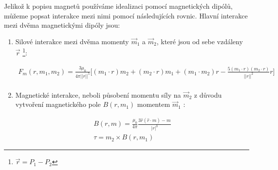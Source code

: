 Jelikož k popisu magnetů používáme idealizaci pomocí magnetických dipólů, můžeme popsat interakce mezi nimi pomocí následujících rovnic.
Hlavní interakce mezi dvěma magnetickými dipóly jsou:
\begin{enumerate}[topsep=0pt, partopsep=0pt]
    \setlength{\itemsep}{0pt}%
    \setlength{\parskip}{0pt}%

    \item Silové interakce \cite{magnetic_force} mezi dvěma momenty $\vec{m}_1$ a $\vec{m}_2$, které jsou od sebe vzdáleny $\vec{r}$ \footnote{$\vec{r} = P_1 - P_2$}:

          \begin{equation}
              \label{eq:F_m}
              \begin{split}
                  F_m (r,m_1,m_2) = \frac{3\mu_0}{4\pi ||r||^5}
                  \bigg[
                      (m_1\cdot r) m_2 +
                      (m_2\cdot r) m_1 +
                      (m_1\cdot m_2) r -
                      \frac{5(m_1\cdot r)(m_2\cdot r)}{||r||^2} r
                  \bigg] \\
              \end{split}
          \end{equation}

    \item Magnetické interakce, neboli působení momentu síly \cite{magnetic_torque} na $\vec{m}_2$ z důvodu vytvoření magnetického pole $B(r, m_1)$ momentem $\vec{m}_1$ \cite{magnetic_force}:

          \begin{equation}
              \label{eq:B}
              \begin{split}
                  B (r, m) = \frac{\mu_0}{4\pi}\frac{3 \hat{r}(\hat{r}\cdot m) - m}{|r|^3} \\
                  \tau = m_2 \times B(r, m_1)
              \end{split}
          \end{equation}
\end{enumerate}
